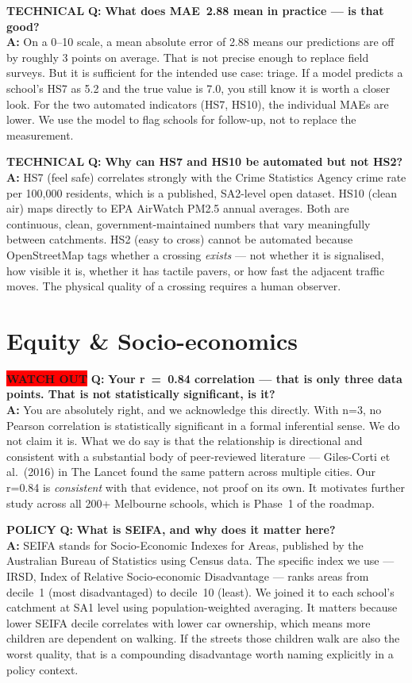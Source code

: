 \documentclass[10pt,a4paper]{extarticle}
\newcommand{\qa}[4]{%
  \begin{mdframed}[
    backgroundcolor=PG,
    linecolor=MG,
    linewidth=1.2pt,
    leftline=true, rightline=false, topline=false, bottomline=false,
    innerleftmargin=10pt, innerrightmargin=8pt,
    innertopmargin=6pt, innerbottommargin=7pt,
    skipabove=5pt, skipbelow=2pt
  ]
  \noindent
  \colorbox{#2}{\tiny\color{white}\textbf{#1}}\hspace{4pt}%
  {\bfseries\color{DG} Q:} {\bfseries\color{INK}#3}\\[3pt]
  {\bfseries\color{MG} A:} {\color{SLT}#4}
  \end{mdframed}%
}
\newcommand{\qatrap}[3]{%
  \begin{mdframed}[
    backgroundcolor=RLT,
    linecolor=RED,
    linewidth=1.2pt,
    leftline=true, rightline=false, topline=false, bottomline=false,
    innerleftmargin=10pt, innerrightmargin=8pt,
    innertopmargin=6pt, innerbottommargin=7pt,
    skipabove=5pt, skipbelow=2pt
  ]
  \noindent
  \colorbox{RED}{\tiny\color{white}\textbf{WATCH OUT}}\hspace{4pt}%
  {\bfseries\color{RED} Q:} {\bfseries\color{INK}#2}\\[3pt]
  {\bfseries\color{RED} A:} {\color{SLT}#3}
  \end{mdframed}%
}
\begin{document}
\qa{TECHNICAL}{MG}
{What does MAE~2.88 mean in practice --- is that good?}
{On a 0--10 scale, a mean absolute error of 2.88 means our predictions are off by roughly 3 points on average. That is not precise enough to replace field surveys. But it is sufficient for the intended use case: triage. If a model predicts a school's HS7 as 5.2 and the true value is 7.0, you still know it is worth a closer look. For the two automated indicators (HS7, HS10), the individual MAEs are lower. We use the model to flag schools for follow-up, not to replace the measurement.}

\qa{TECHNICAL}{MG}
{Why can HS7 and HS10 be automated but not HS2?}
{HS7 (feel safe) correlates strongly with the Crime Statistics Agency crime rate per 100,000 residents, which is a published, SA2-level open dataset. HS10 (clean air) maps directly to EPA AirWatch PM2.5 annual averages. Both are continuous, clean, government-maintained numbers that vary meaningfully between catchments. HS2 (easy to cross) cannot be automated because OpenStreetMap tags whether a crossing \emph{exists} --- not whether it is signalised, how visible it is, whether it has tactile pavers, or how fast the adjacent traffic moves. The physical quality of a crossing requires a human observer.}

\section{Equity \& Socio-economics}

\qatrap{WATCH OUT}
{Your r~=~0.84 correlation --- that is only three data points. That is not statistically significant, is it?}
{You are absolutely right, and we acknowledge this directly. With n=3, no Pearson correlation is statistically significant in a formal inferential sense. We do not claim it is. What we do say is that the relationship is directional and consistent with a substantial body of peer-reviewed literature --- Giles-Corti et al.\ (2016) in The Lancet found the same pattern across multiple cities. Our r=0.84 is \emph{consistent} with that evidence, not proof on its own. It motivates further study across all 200+ Melbourne schools, which is Phase~1 of the roadmap.}

\qa{POLICY}{AMB}
{What is SEIFA, and why does it matter here?}
{SEIFA stands for Socio-Economic Indexes for Areas, published by the Australian Bureau of Statistics using Census data. The specific index we use --- IRSD, Index of Relative Socio-economic Disadvantage --- ranks areas from decile~1 (most disadvantaged) to decile~10 (least). We joined it to each school's catchment at SA1 level using population-weighted averaging. It matters because lower SEIFA decile correlates with lower car ownership, which means more children are dependent on walking. If the streets those children walk are also the worst quality, that is a compounding disadvantage worth naming explicitly in a policy context.}
\end{document}
